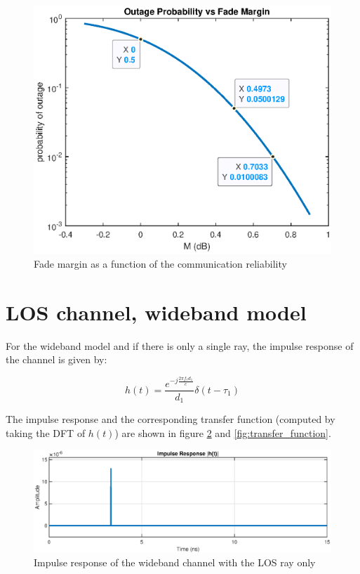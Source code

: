 \documentclass[10pt,a4paper]{ULBreport}
\begin{document}
\begin{figure}[H]
    \centering
    \includegraphics[width=1\textwidth]{3_7.eps}
    \caption{Fade margin as a function of the communication reliability}
    \label{fig:fade_margin}
\end{figure}

\section{LOS channel, wideband model}
\label{sec:LOS_channel_wideband}

For the wideband model and if there is only a single ray, the impulse response of the channel is given by:

\begin{equation*}
    h(t) = \frac{e^{-j \frac{2\pi f_cd_1}{c}}}{d_1} \delta(t - \tau_1)
\end{equation*}

The impulse response and the corresponding transfer function (computed by taking the DFT of $h(t)$) are shown in figure \ref{fig:impulse_response} and \ref{fig:transfer_function}. 

\begin{figure}[H]
    \centering
    \includegraphics[width=1\textwidth]{4_1_temp.eps}
    \caption{Impulse response of the wideband channel with the LOS ray only} 
    \label{fig:impulse_response}
\end{figure}
\end{document}
